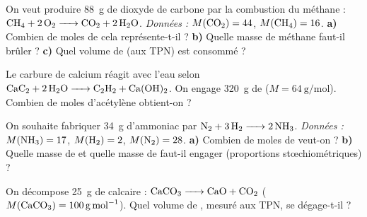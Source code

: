 \documentclass[11pt,a4paper]{article}
\begin{document}
\begin{exo}
On veut produire \SI{88}{\gram} de dioxyde de carbone par la combustion du méthane :
$\ce{CH4 + 2 O2 -> CO2 + 2 H2O}$. \emph{Données :} $M(\ce{CO2})=44$, $M(\ce{CH4})=16$.
\textbf{a)} Combien de moles de  cela représente-t-il ?\quad
\textbf{b)} Quelle masse de méthane faut-il brûler ?\quad
\textbf{c)} Quel volume de  (aux TPN) est consommé ?
\end{exo}

\begin{exo}
Le carbure de calcium réagit avec l'eau selon
$\ce{CaC2 + 2 H2O -> C2H2 + Ca(OH)2}$. On engage \SI{320}{\gram} de 
($M=\SI{64}{\gram\per\mole}$). Combien de moles d'acétylène  obtient-on ?
\end{exo}

\begin{exo}
On souhaite fabriquer \SI{34}{\gram} d'ammoniac par $\ce{N2 + 3 H2 -> 2 NH3}$.
\emph{Données :} $M(\ce{NH3})=17$, $M(\ce{H2})=2$, $M(\ce{N2})=28$.
\textbf{a)} Combien de moles de  veut-on ?\quad
\textbf{b)} Quelle masse de  et quelle masse de  faut-il engager (proportions stœchiométriques) ?
\end{exo}

\begin{exo}
On décompose \SI{25}{\gram} de calcaire : $\ce{CaCO3 -> CaO + CO2}$
($M(\ce{CaCO3})=\SI{100}{\gram\per\mole}$).
Quel volume de , mesuré aux TPN, se dégage-t-il ?
\end{exo}
\end{document}
